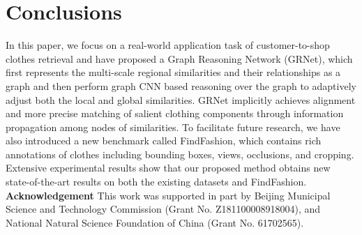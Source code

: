 \documentclass[10pt,twocolumn,letterpaper]{article}
\begin{document}
\section{Conclusions}
In this paper, we focus on a real-world application task of customer-to-shop clothes retrieval and have proposed a Graph Reasoning Network (GRNet), which first represents the multi-scale regional similarities and their relationships as a graph and then perform graph CNN based reasoning over the graph to adaptively adjust both the local and global similarities. GRNet implicitly achieves alignment and more precise matching of salient clothing components through information propagation among nodes of similarities. To facilitate future research, we have also introduced a new benchmark called FindFashion, which contains rich annotations of clothes including bounding boxes, views, occlusions, and cropping. Extensive experimental results show that our proposed method obtains new state-of-the-art results on both the existing datasets and FindFashion.
\\
\textbf{Acknowledgement} This work was supported in part by Beijing Municipal Science and Technology Commission (Grant No. Z181100008918004), and National Natural Science Foundation of China (Grant No. 61702565).
{\small


}
\end{document}
